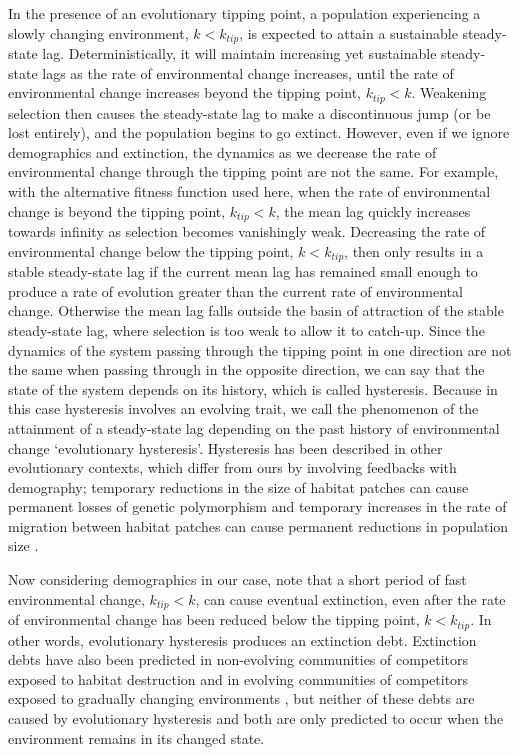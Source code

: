 \documentclass[12pt,letterpaper]{article} %
\begin{document}
In the presence of an evolutionary tipping point, a population experiencing a slowly changing environment, $k<k_{tip}$, is expected to attain a sustainable steady-state lag.
Deterministically, it will maintain increasing yet sustainable steady-state lags as the rate of environmental change increases, until the rate of environmental change increases beyond the tipping point, $k_{tip}<k$.
Weakening selection then causes the steady-state lag to make a discontinuous jump (or be lost entirely), and the population begins to go extinct.
However, even if we ignore demographics and extinction, the dynamics as we decrease the rate of environmental change through the tipping point are not the same.
For example, with the alternative fitness function used here, when the rate of environmental change is beyond the tipping point, $k_{tip}<k$, the mean lag quickly increases towards infinity as selection becomes vanishingly weak.
Decreasing the rate of environmental change below the tipping point, $k<k_{tip}$, then only results in a stable steady-state lag if the current mean lag has remained small enough to produce a rate of evolution greater than the current rate of environmental change.
Otherwise the mean lag falls outside the basin of attraction of the stable steady-state lag, where selection is too weak to allow it to catch-up. 
Since the dynamics of the system passing through the tipping point in one direction are not the same when passing through in the opposite direction, we can say that the state of the system depends on its history, which is called hysteresis.
Because in this case hysteresis involves an evolving trait, we call the phenomenon of the attainment of a steady-state lag depending on the past history of environmental change `evolutionary hysteresis'. 
Hysteresis has been described in other evolutionary contexts, which differ from ours by involving feedbacks with demography; temporary reductions in the size of habitat patches can cause permanent losses of genetic polymorphism \citep{Kisdi1999} and temporary increases in the rate of migration between habitat patches can cause permanent reductions in population size \citep{Ronce2001}.

Now considering demographics in our case, note that a short period of fast environmental change, $k_{tip}<k$, can cause eventual extinction, even after the rate of environmental change has been reduced below the tipping point, $k<k_{tip}$.
In other words, evolutionary hysteresis produces an extinction debt.
Extinction debts have also been predicted in non-evolving communities of competitors exposed to habitat destruction \citep{Tilman1994a} and in evolving communities of competitors exposed to gradually changing environments \citep{Norberg2012}, but neither of these debts are caused by evolutionary hysteresis and both are only predicted to occur when the environment remains in its changed state.
\end{document}
